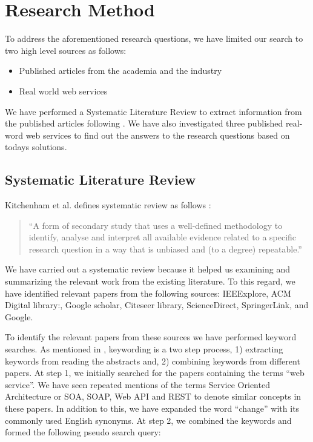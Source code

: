 \documentclass[runningheads,a4paper]{llncs}
\begin{document}
\section{Research Method} %
\label{sec:research_method}

To address the aforementioned research questions, we have limited our search to two high level sources as follows:

\begin{itemize}
  \item Published articles from the academia and the industry
  \item Real world web services
\end{itemize}

We have performed a Systematic Literature Review to extract information from the published articles following \cite{kitchenham2007guidelines}. We have also investigated three published real-word web services to find out the answers to the research questions based on todays solutions.

\subsection{Systematic Literature Review} %
\label{sub:systematic_literature_review}
Kitchenham et al. defines systematic review as follows \cite{kitchenham2007guidelines}:

\begin{quote}
``A form of secondary study that uses a well-defined methodology to identify, analyse and interpret all available evidence related to a specific research question in a way that is unbiased and (to a degree) repeatable.''
\end{quote}
We have carried out a systematic review because it helped us examining and summarizing the relevant work from the existing literature. To this regard, we have identified relevant papers from the following sources: IEEExplore, ACM Digital library:, Google scholar, Citeseer library, ScienceDirect, SpringerLink, and Google.

To identify the relevant papers from these sources we have performed keyword searches. As mentioned in \cite{petersen2008systematic}, keywording is a two step process, 1) extracting keywords from reading the abstracts and, 2) combining keywords from different papers. At step 1, we initially searched for the papers containing the terms ``web service''. We have seen repeated mentions of the terms Service Oriented Architecture or SOA, SOAP, Web API and REST to denote similar concepts in these papers. In addition to this, we have expanded the word ``change'' with its commonly used English synonyms. At step 2, we combined the keywords and formed the following pseudo search query:
\end{document}
